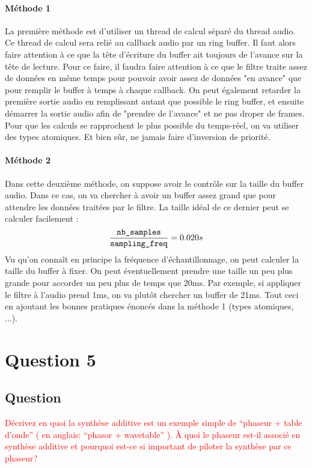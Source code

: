 \documentclass[letterpaper, 12pt]{article}
\newcommand{\alinea}{
\hspace*{0.5cm}}
\newcommand{\red}[1]{
	\textcolor{red}{#1}}
\begin{document}
			\paragraph{Méthode 1} La première méthode est d'utiliser un thread de calcul séparé du thread audio. Ce thread de calcul
				sera relié au callback audio par un ring buffer. Il faut alors faire attention à ce que la tête d'écriture du buffer
				ait toujours de l'avance sur la tête de lecture. Pour ce faire, il faudra faire attention à ce que le filtre traite
				assez de données en même temps pour pouvoir avoir assez de données "en avance" que pour remplir le buffer à temps à 
				chaque callback. On peut également retarder la première sortie audio en remplissant autant que possible le ring buffer,
				et ensuite démarrer la sortie audio afin de "prendre de l'avance" et ne pas droper de frames. 
				Pour que les calculs se rapprochent le plus possible du temps-réel, on va utiliser des types atomiques.
				Et bien sûr, ne jamais faire d'inversion de priorité.
			\paragraph{Méthode 2} Dans cette deuxième méthode, on suppose avoir le contrôle sur la taille du buffer audio.
				Dans ce cas, on va chercher à avoir un buffer assez grand que pour attendre les données traitées par le filtre.
				La taille idéal de ce dernier peut se calculer facilement : 
				$$\frac{\text{\texttt{nb\_samples}}}{\text{\texttt{sampling\_freq}}} = 0.020s$$
				Vu qu'on connaît en principe la fréquence d'échantillonnage, on peut calculer la taille du buffer à fixer.
				On peut éventuellement prendre une taille un peu plus grande pour accorder un peu plus de temps que 20ms. 
				Par exemple, si appliquer le filtre à l'audio prend 1ms, on va plutôt chercher un buffer de 21ms.
				Tout ceci en ajoutant les bonnes pratiques énoncés dans la méthode 1 (types atomiques, ...).
	\section{Question 5}
		\subsection{Question}
			\alinea \red{Décrivez en quoi la synthèse additive est un exemple simple de “phaseur + table d’onde” 
				( en anglais: “phasor + wavetable” ). À quoi le phaseur est-il associé en synthèse additive et pourquoi est-ce si 
				important de piloter la synthèse par ce phaseur?}
\end{document}
